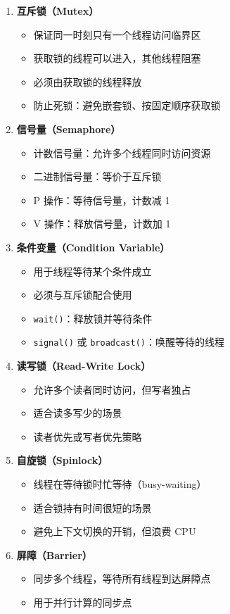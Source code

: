 \begin{enumerate}
  \item \textbf{互斥锁（Mutex）}
    \begin{itemize}
      \item 保证同一时刻只有一个线程访问临界区
      \item 获取锁的线程可以进入，其他线程阻塞
      \item 必须由获取锁的线程释放
      \item 防止死锁：避免嵌套锁、按固定顺序获取锁
    \end{itemize}

  \item \textbf{信号量（Semaphore）}
    \begin{itemize}
      \item 计数信号量：允许多个线程同时访问资源
      \item 二进制信号量：等价于互斥锁
      \item P 操作：等待信号量，计数减 1
      \item V 操作：释放信号量，计数加 1
    \end{itemize}

  \item \textbf{条件变量（Condition Variable）}
    \begin{itemize}
      \item 用于线程等待某个条件成立
      \item 必须与互斥锁配合使用
      \item \texttt{wait()}：释放锁并等待条件
      \item \texttt{signal()} 或 \texttt{broadcast()}：唤醒等待的线程
    \end{itemize}

  \item \textbf{读写锁（Read-Write Lock）}
    \begin{itemize}
      \item 允许多个读者同时访问，但写者独占
      \item 适合读多写少的场景
      \item 读者优先或写者优先策略
    \end{itemize}

  \item \textbf{自旋锁（Spinlock）}
    \begin{itemize}
      \item 线程在等待锁时忙等待（busy-waiting）
      \item 适合锁持有时间很短的场景
      \item 避免上下文切换的开销，但浪费 CPU
    \end{itemize}

  \item \textbf{屏障（Barrier）}
    \begin{itemize}
      \item 同步多个线程，等待所有线程到达屏障点
      \item 用于并行计算的同步点
    \end{itemize}
\end{enumerate}


